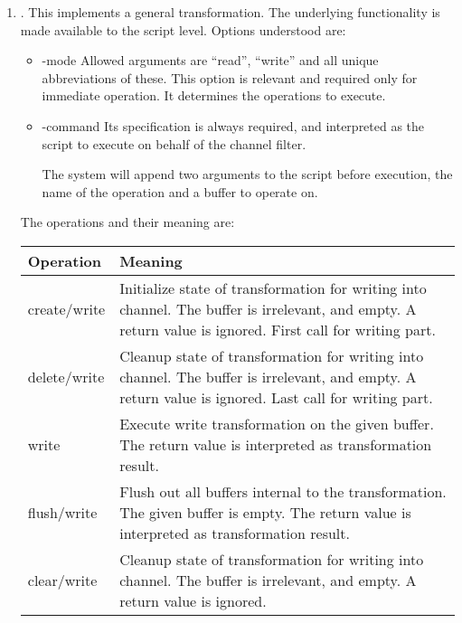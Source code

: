 \documentclass {report}
\begin{document}
\begin	{enumerate}
\item	{}. This implements a general transformation.
	The underlying functionality is made available to the script
	level. Options understood are:

	\begin	{itemize}
	\item [-mode]
		Allowed arguments are ``read'', ``write'' and all
		unique abbreviations of these. This option is relevant
		and required only for immediate operation. It
		determines the operations to execute. 

	\item [-command]
		Its specification is always required, and interpreted
		as the script to execute on behalf of the
		channel filter.

		The system will append two arguments to the script
		before execution, the name of the operation and a
		buffer to operate on.
	\end	{itemize}

	The operations and their meaning are:
	\begin {center}
	\begin {tabular}{l|p{8cm}}
	Operation	& Meaning					\\ \hline
	create/write	& Initialize state of transformation for
			  writing into channel. The buffer is
			  irrelevant, and empty. A return value is
			  ignored. First call for writing part. 	\\
	delete/write	& Cleanup state of transformation for
			  writing into channel. The buffer is
			  irrelevant, and empty. A return value is
			  ignored. Last call for writing part.		\\
	write		& Execute write transformation on the given
			  buffer. The return value is interpreted as
			  transformation result.			\\
	flush/write	& Flush out all buffers internal to the
			  transformation. The given buffer is
			  empty. The return value is interpreted as
			  transformation result.			\\
	clear/write	& Cleanup state of transformation for
			  writing into channel. The buffer is
			  irrelevant, and empty. A return value is
			  ignored.					\\ \hline


\end{tabular}
\end{center}
\end{enumerate}
\end{document}
